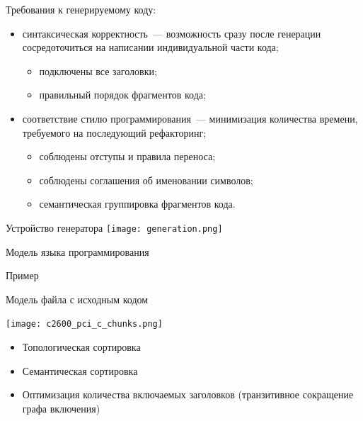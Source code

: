 \documentclass[unicode,hyperref={unicode=true}]{beamer}
\theoremstyle{definition}
\theoremstyle{plain}
\begin{document}
\begin{frame}{Требования к генерируемому коду:}
\begin{itemize}
\item синтаксическая корректность~--- возможность сразу после генерации
сосредоточиться на написании индивидуальной части кода;
\begin{itemize}
\item подключены все заголовки;
\item правильный порядок фрагментов кода;
\end{itemize}
\item соответствие стилю программирования~--- минимизация количества времени,
требуемого на последующий рефакторинг;
\begin{itemize}
\item соблюдены отступы и правила переноса;
\item соблюдены соглашения об именовании символов;
\item семантическая группировка фрагментов кода.
\end{itemize}
\end{itemize}
\end{frame}



\begin{frame}{Устройство генератора}
\texttt{[image: generation.png]}
\end{frame}



\begin{frame}{Модель языка программирования}
\end{frame}



\begin{frame}{Пример}
\end{frame}



\begin{frame}{Модель файла с исходным кодом}
\begin{minipage}{0.61\textwidth}
\texttt{[image: c2600\_pci\_c\_chunks.png]}
\end{minipage}
\begin{minipage}{0.37\textwidth}
\begin{itemize}
\item Топологическая сортировка
\item Семантическая сортировка
\item Оптимизация количества включаемых заголовков (транзитивное сокращение
графа включения)
\end{itemize}
\end{minipage}
\end{frame}
\end{document}
